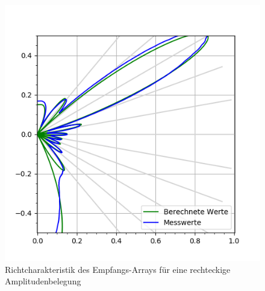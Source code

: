 \clearpage
\begin{figure}[htb]
\begin{minipage}{0.5\textwidth}
\includegraphics[width=\textwidth]{graphics/plot_test_characteristic_receiver_30_deg_send_rect_receive_rect_6_bursts.png}
\caption{Richtcharakteristik des Empfangs-Arrays für eine rechteckige Amplitudenbelegung} %
\label{fig:plot_test_characteristic_receiver_30_deg_send_rect_receive_rect_6_bursts}
%
\end{minipage}
\begin{minipage}{0.5\textwidth}

\end{minipage}
\end{figure}
